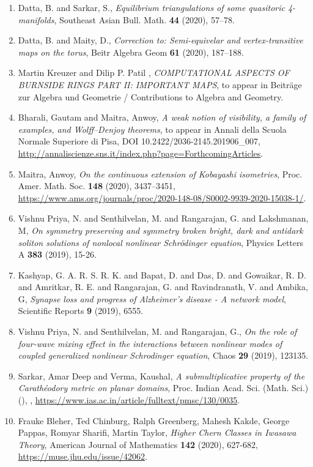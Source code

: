 \begin{enumerate}
\item Datta, B. and Sarkar, S., \emph{Equilibrium triangulations of some quasitoric 4-manifolds}, Southeast Asian Bull. Math. {\bf 44} (2020), 57--78.
\item Datta, B. and Maity, D., \emph{Correction to: Semi-equivelar and vertex-transitive maps on the torus}, Beitr Algebra Geom {\bf 61} (2020), 187--188.
\item Martin Kreuzer and Dilip P. Patil , \emph{COMPUTATIONAL ASPECTS OF BURNSIDE RINGS PART II: IMPORTANT MAPS}, to appear in Beiträge zur Algebra und Geometrie / Contributions to Algebra and Geometry.
\item Bharali, Gautam and Maitra, Anwoy, \emph{A weak notion of visibility, a family of examples, and Wolff--Denjoy theorems}, to appear in Annali della Scuola Normale Superiore di Pisa, DOI 10.2422/2036-2145.201906_007, \url{http://annaliscienze.sns.it/index.php?page=ForthcomingArticles}.
\item Maitra, Anwoy, \emph{On the continuous extension of Kobayashi isometries}, Proc. Amer. Math. Soc. {\bf 148} (2020), 3437--3451, \url{https://www.ams.org/journals/proc/2020-148-08/S0002-9939-2020-15038-1/}.
\item Vishnu Priya, N. and Senthilvelan, M. and  Rangarajan, G. and Lakshmanan, M, \emph{On symmetry preserving and symmetry broken bright, dark and antidark soliton solutions of nonlocal nonlinear Schrödinger equation}, Physics Letters A {\bf 383} (2019), 15-26.
\item Kashyap, G. A. R. S. R. K. and Bapat, D. and Das, D. and Gowaikar, R. D. and Amritkar, R. E. and Rangarajan, G. and Ravindranath, V. and Ambika, G, \emph{Synapse loss and progress of Alzheimer’s disease - A network model}, Scientific Reports {\bf 9} (2019), 6555.
\item Vishnu Priya, N. and Senthilvelan, M. and Rangarajan, G., \emph{On the role of four-wave mixing effect in the interactions between nonlinear modes of coupled generalized nonlinear Schrodinger equation}, Chaos {\bf 29} (2019), 123135.
\item Sarkar, Amar Deep and Verma, Kaushal, \emph{A submultiplicative property of the Carath\'{e}odory metric on planar domains}, Proc. Indian Acad. Sci. (Math. Sci.) {\bf } (), , \url{https://www.ias.ac.in/article/fulltext/pmsc/130/0035}.
\item Frauke Bleher, Ted Chinburg, Ralph Greenberg, Mahesh Kakde, George Pappas, Romyar Sharifi, Martin Taylor, \emph{Higher Chern Classes in Iwasawa Theory}, American Journal of Mathematics {\bf 142} (2020), 627-682, \url{https://muse.jhu.edu/issue/42062}.

\end{enumerate}
